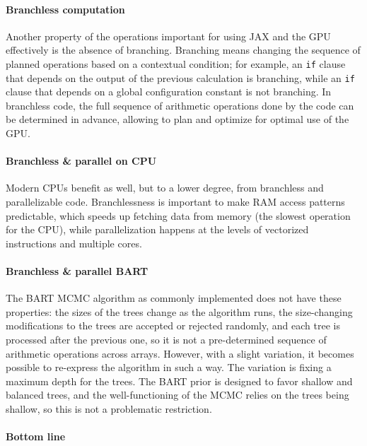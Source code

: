 \documentclass{article}
\begin{document}
    \paragraph{Branchless computation}

    Another property of the operations important for using JAX and the GPU effectively is the absence of branching. Branching means changing the sequence of planned operations based on a contextual condition; for example, an \texttt{if} clause that depends on the output of the previous calculation is branching, while an \texttt{if} clause that depends on a global configuration constant is not branching. In branchless code, the full sequence of arithmetic operations done by the code can be determined in advance, allowing to plan and optimize for optimal use of the GPU.

    \paragraph{Branchless \& parallel on CPU}

    Modern CPUs benefit as well, but to a lower degree, from branchless and parallelizable code. Branchlessness is important to make RAM access patterns predictable, which speeds up fetching data from memory (the slowest operation for the CPU), while parallelization happens at the levels of vectorized instructions and multiple cores.

    \paragraph{Branchless \& parallel BART}

    The BART MCMC algorithm as commonly implemented does not have these properties: the sizes of the trees change as the algorithm runs, the size-changing modifications to the trees are accepted or rejected randomly, and each tree is processed after the previous one, so it is not a pre-determined sequence of arithmetic operations across arrays. However, with a slight variation, it becomes possible to re-express the algorithm in such a way. The variation is fixing a maximum depth for the trees. The BART prior is designed to favor shallow and balanced trees, and the well-functioning of the MCMC relies on the trees being shallow, so this is not a problematic restriction.

    \paragraph{Bottom line}
\end{document}
